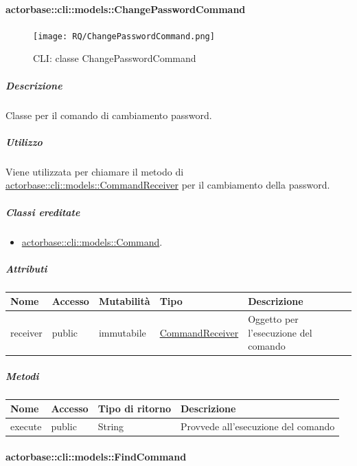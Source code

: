 \documentclass{scalatekids-article}
\begin{document}
\paragraph{actorbase::cli::models::ChangePasswordCommand}
\label{sec:actorbase::cli::models::ChangePasswordCommand}

\begin{figure}[H]
  \begin{center}
    \texttt{[image: RQ/ChangePasswordCommand.png]}
    \caption{CLI: classe ChangePasswordCommand}
  \end{center}
\end{figure}

\subparagraph{Descrizione}

Classe per il comando di cambiamento password.

\subparagraph{Utilizzo}

Viene utilizzata per chiamare il metodo di
\hyperref[sec:actorbase::cli::models::CommandReceiver]{actorbase::cli::models::CommandReceiver} per il cambiamento della password.

\subparagraph{Classi ereditate}

\begin{itemize}
\item \hyperref[sec:actorbase::cli::models::Command]{actorbase::cli::models::Command}.
\end{itemize}

\subparagraph{Attributi}

\begin{tabular}{| p{1cm} | p{1.5cm} | p{2cm} | p{4cm} | p{8.5cm} |}
  \hline
  Nome & Accesso & Mutabilità & Tipo & Descrizione\\
  \hline
  receiver & public & immutabile & \hyperref[sec:actorbase::cli::models::CommandReceiver]{CommandReceiver} & Oggetto per l'esecuzione del comando\\
  \hline
\end{tabular}

\subparagraph{Metodi}

\begin{tabular}{| l | l | l | l |}
  \hline
  Nome & Accesso & Tipo di ritorno & Descrizione\\
  \hline
  execute & public & String & Provvede all'esecuzione del comando\\
  \hline
\end{tabular}


\paragraph{actorbase::cli::models::FindCommand}
\label{sec:actorbase::cli::models::FindCommand}
\end{document}
